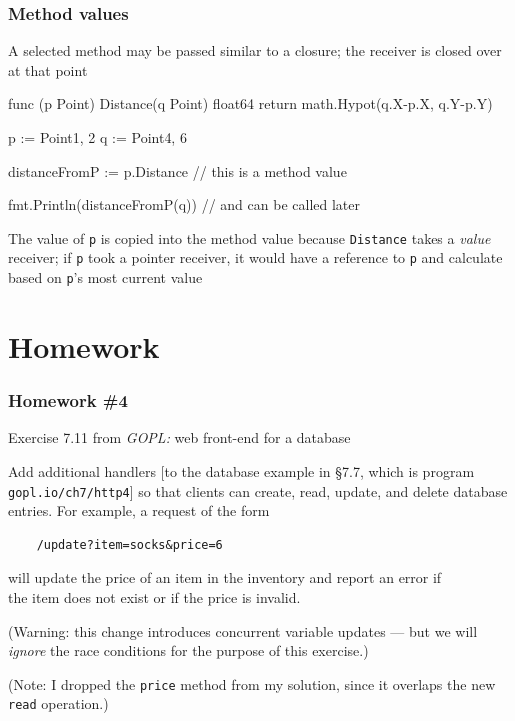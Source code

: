 \documentclass[handout,compress,t,11pt]{beamer}
\begin{document}
\begin{frame}[fragile]
    \frametitle{Method values}
    A selected method may be passed similar to a closure; the receiver is closed 
    over at that point
    \vspace{0.4\baselineskip}
\begin{golang}
func (p Point) Distance(q Point) float64 {
    return math.Hypot(q.X-p.X, q.Y-p.Y)
}

p := Point{1, 2}
q := Point{4, 6}

distanceFromP := p.Distance    // this is a method value

fmt.Println(distanceFromP(q))  // and can be called later
\end{golang}
    \vspace{0.4\baselineskip}
The value of \verb|p| is copied into the method value because \verb|Distance| takes 
a {\em value} receiver; if \verb|p| took a pointer receiver, it would have a reference 
to \verb|p| and calculate based on \verb|p|'s most current value
\end{frame}



\section{Homework}

\begin{frame}[fragile]
\frametitle{Homework \#4}
Exercise 7.11 from {\em GOPL:} web front-end for a database \par
    \vspace{0.4\baselineskip}
{\small {}Add additional handlers [to the database example in \S7.7,
which is program \verb|gopl.io/ch7/http4|]
so that clients can create, read, update, and delete database entries. For example, 
a request of the form 
\begin{verbatim}
    /update?item=socks&price=6
\end{verbatim}
will update the price of an item in the inventory and report an error if \\
the item does not exist or if the price is invalid. \par
    \vspace{0.4\baselineskip}
(Warning: this change introduces concurrent 
variable updates --- but we will {\em ignore} the race conditions for the purpose
of this exercise.) \par
    \vspace{0.4\baselineskip}
(Note: I dropped the \verb|price| method from my solution, since it overlaps the
new \verb|read| operation.)}
\end{frame}
\end{document}
